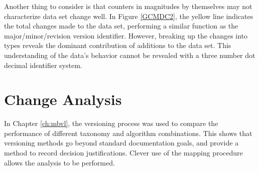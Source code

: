 Another thing to consider is that counters in magnitudes by themselves may not characterize data set change well.
In Figure \ref{GCMDC2}, the yellow line indicates the total changes made to the data set, performing a similar function as the major/minor/revision version identifier.
However, breaking up the changes into types reveals the dominant contribution of additions to the data set.
This understanding of the data's behavior cannot be revealed with a three number dot decimal identifier system.

\section{Change Analysis}

In Chapter \ref{ch:mbvl}, the versioning process was used to compare the performance of different taxonomy and algorithm combinations.
This shows that versioning methods go beyond standard documentation goals, and provide a method to record decision justifications.
Clever use of the mapping procedure allows the analysis to be performed.